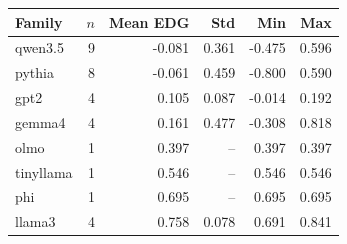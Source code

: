 \begin{tabular}{@{}lrrrrr@{}}
\toprule
\textbf{Family} & $n$ & \textbf{Mean EDG} & \textbf{Std} & \textbf{Min} & \textbf{Max}\\
\midrule
qwen3.5 & 9 & -0.081 & 0.361 & -0.475 & 0.596 \\
pythia & 8 & -0.061 & 0.459 & -0.800 & 0.590 \\
gpt2 & 4 & 0.105 & 0.087 & -0.014 & 0.192 \\
gemma4 & 4 & 0.161 & 0.477 & -0.308 & 0.818 \\
olmo & 1 & 0.397 & -- & 0.397 & 0.397 \\
tinyllama & 1 & 0.546 & -- & 0.546 & 0.546 \\
phi & 1 & 0.695 & -- & 0.695 & 0.695 \\
llama3 & 4 & 0.758 & 0.078 & 0.691 & 0.841 \\
\bottomrule
\end{tabular}